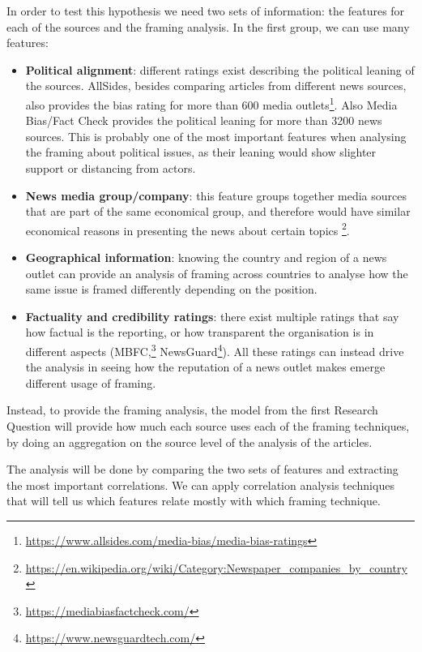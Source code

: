 In order to test this hypothesis we need two sets of information: the features for each of the sources and the framing analysis.
In the first group, we can use many features:

\begin{itemize}
    \item \textbf{Political alignment}: different ratings exist describing the political leaning of the sources. AllSides, besides comparing articles from different news sources, also provides the bias rating for more than 600 media outlets\footnote{\url{https://www.allsides.com/media-bias/media-bias-ratings}}. Also Media Bias/Fact Check provides the political leaning for more than 3200 news sources. This is probably one of the most important features when analysing the framing about political issues, as their leaning would show slighter support or distancing from actors.
    \item \textbf{News media group/company}: this feature groups together media sources that are part of the same economical group, and therefore would have similar economical reasons in presenting the news about certain topics \footnote{\url{https://en.wikipedia.org/wiki/Category:Newspaper_companies_by_country}}. %
    \item \textbf{Geographical information}: knowing the country and region of a news outlet can provide an analysis of framing across countries to analyse how the same issue is framed differently depending on the position.
    \item \textbf{Factuality and credibility ratings}: there exist multiple ratings that say how factual is the reporting, or how transparent the organisation is in different aspects (MBFC,\footnote{\url{https://mediabiasfactcheck.com/}} NewsGuard\footnote{\url{https://www.newsguardtech.com/}}). All these ratings can instead drive the analysis in seeing how the reputation of a news outlet makes emerge different usage of framing.
\end{itemize}

Instead, to provide the framing analysis, the model from the first Research Question will provide how much each source uses each of the framing techniques, by doing an aggregation on the source level of the analysis of the articles.

The analysis will be done by comparing the two sets of features and extracting the most important correlations.
We can apply correlation analysis techniques that will tell us which features relate mostly with which framing technique. 

